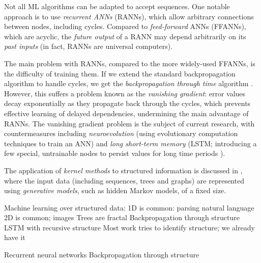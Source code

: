 Not all ML algorithms can be adapted to accept sequences. One notable approach
is to use \emph{recurrent ANNs} (RANNs), which allow arbitrary connections
between nodes, including cycles. Compared to \emph{feed-forward} ANNs (FFANNs),
which are acyclic, the \emph{future output} of a RANN may depend arbitrarily on
its \emph{past inputs} (in fact, RANNs are universal computers).

The main problem with RANNs, compared to the more widely-used FFANNs, is the
difficulty of training them. If we extend the standard backpropagation algorithm
to handle cycles, we get the \emph{backpropagation through time} algorithm
\cite{werbos1990backpropagation}. However, this suffers a problem known as the
\emph{vanishing gradient}: error values decay exponentially as they propagate
back through the cycles, which prevents effective learning of delayed
dependencies, undermining the main advantage of RANNs. The vanishing gradient
problem is the subject of current research, with countermeasures including
\emph{neuroevolution} (using evolutionary computation techniques to train an
ANN) and \emph{long short-term memory} (LSTM; introducing a few special,
untrainable nodes to persist values for long time periods
\cite{hochreiter1997long}).

The application of \emph{kernel methods} to structured information is discussed
in \cite{Gartner2003}, where the input data (including sequences, trees and
graphs) are represented using \emph{generative models}, such as hidden Markov
models, of a fixed size.

\cite{Gartner2003}
\cite{Oveisi.Oveisi.Erfanian.ea:2012}
\cite{bakir2007predicting}
\cite{conf/ijcai/Plate91}
\cite{goller1996learning}
\cite{kwasny1995tail}
\cite{pollack1990recursive}
\cite{zanzotto2012distributed}

Machine learning over structured data:
1D is common: parsing natural language
2D is common; images
Trees are fractal
Backpropagation through structure
LSTM with recursive structure
Most work tries to identify structure; we already have it

Recurrent neural networks
Backpropagation through structure
